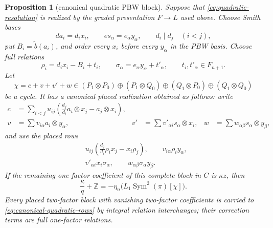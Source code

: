 \documentclass[11pt]{amsart}
\newtheorem{proposition}[theorem]{Proposition}
\theoremstyle{remark}
\newcommand{\Z}{\mathbb Z}
\newcommand{\Sym}{\operatorname{Sym}}
\begin{document}
\begin{proposition}[canonical quadratic PBW block]
\label{prop:quadratic-block}
Suppose that \eqref{eq:quadratic-resolution} is realized by the graded
presentation $F\to L$ used above.  Choose Smith bases
\[
 da_i=d_ix_i,
 \qquad es_\alpha=e_\alpha y_\alpha,
 \qquad d_i\mid d_j\quad(i<j),
\]
put $B_i=\widetilde b(a_i)$, and order every $x_i$ before every
$y_\alpha$ in the PBW basis.  Choose full relations
\begin{equation}\label{eq:quadratic-full-relations}
 \rho_i=d_ix_i-B_i+t_i,
 \qquad
 \sigma_\alpha=e_\alpha y_\alpha+t'_\alpha,
 \qquad t_i,t'_\alpha\in F_{n+1}.
\end{equation}
Let
\[
 \chi=c+v+v'+w\in
 (P_1\otimes P_0)\oplus(P_1\otimes Q_0)
 \oplus(Q_1\otimes P_0)\oplus(Q_1\otimes Q_0)
\]
be a cycle.  It has a canonical placed realization obtained as follows:
write
\begin{align*}
 c&=\sum_{i<j}u_{ij}
 \left(\frac{d_j}{d_i}a_i\otimes x_j-a_j\otimes x_i\right),\\
 v&=\sum v_{i\alpha}a_i\otimes y_\alpha,
 &v'&=\sum v'_{\alpha i}s_\alpha\otimes x_i,
 &w&=\sum w_{\alpha\beta}s_\alpha\otimes y_\beta,
\end{align*}
and use the placed rows
\begin{equation}\label{eq:canonical-quadratic-rows}
 \begin{split}
 &u_{ij}\left(\frac{d_j}{d_i}\rho_i x_j-x_i\rho_j\right),
 \qquad v_{i\alpha}\rho_i y_\alpha,\\
 &v'_{\alpha i}x_i\sigma_\alpha,
 \qquad w_{\alpha\beta}\sigma_\alpha y_\beta.
 \end{split}
\end{equation}
If the remaining one-factor coefficient of this complete block in $C$
is $\kappa z$, then
\begin{equation}\label{eq:quadratic-PBW-block}
 \frac\kappa q+\Z
 =-\eta_n\bigl(L_1\Sym^2(\pi)[\chi]\bigr).
\end{equation}
Every placed two-factor block with vanishing two-factor coefficients is
carried to \eqref{eq:canonical-quadratic-rows} by integral relation
interchanges; their correction terms are full one-factor relations.
\end{proposition}
\end{document}

